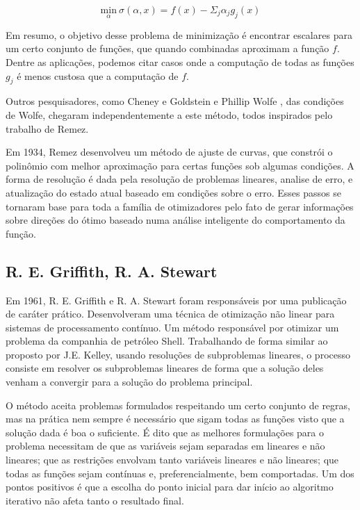 \vspace{-15pt}
\begin{equation}
  \underset{\alpha}{\mathrm{min}}\ \sigma(\alpha, x) = f(x) - \Sigma_j \alpha_j g_j(x)
\end{equation}

Em resumo, o objetivo desse problema de minimização é encontrar escalares para um certo
conjunto de funções, que quando combinadas aproximam a função \(f\). Dentre as aplicações,
podemos citar casos onde a computação de todas as funções \(g_j\) é menos custosa que a
computação de \(f\).

Outros pesquisadores, como Cheney e Goldstein \cite{cheney1959newton} e Phillip Wolfe \cite{wolfe1960rand},
das condições de Wolfe, chegaram independentemente a este método, todos inspirados pelo trabalho de Remez.

Em 1934, Remez \cite{remez1934procede} desenvolveu um método de ajuste de curvas, que constrói o polinômio
com melhor aproximação para certas funções sob algumas condições. A forma de resolução é dada
pela resolução de problemas lineares, analise de erro, e atualização do estado atual baseado
em condições sobre o erro. Esses passos se tornaram base para toda a família de otimizadores
pelo fato de gerar informações sobre direções do ótimo baseado numa análise inteligente do
comportamento da função.

\subsection{R. E. Griffith, R. A. Stewart}

Em 1961, R. E. Griffith e R. A. Stewart \cite{griffith1961nonlinear} foram responsáveis por uma publicação
de caráter prático. Desenvolveram uma técnica de otimização não linear para sistemas de processamento
contínuo. Um método responsável por otimizar um problema da companhia de petróleo Shell. Trabalhando
de forma similar ao proposto por J.E. Kelley, usando resoluções de subproblemas lineares, o processo
consiste em resolver os subproblemas lineares de forma que a solução deles venham a convergir para
a solução do problema principal.

O método aceita problemas formulados respeitando um certo conjunto de regras, mas na prática nem
sempre é necessário que sigam todas as funções visto que a solução dada é boa o suficiente. É dito
que as melhores formulações para o problema necessitam de que as variáveis sejam separadas em lineares
e não lineares; que as restrições envolvam tanto variáveis lineares e não lineares; que todas as funções
sejam contínuas e, preferencialmente, bem comportadas. Um dos pontos positivos é que a escolha do ponto
inicial para dar início ao algoritmo iterativo não afeta tanto o resultado final.

